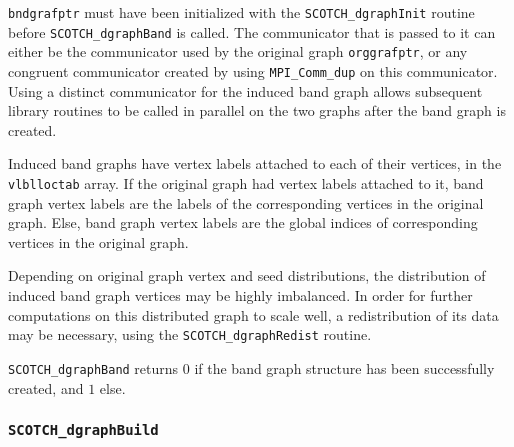 \begin{itemize}
{\tt bndgrafptr} must have been initialized with the
{\tt SCOTCH\_\lbt dgraph\lbt Init} routine before
{\tt SCOTCH\_dgraph\lbt Band} is called. The communicator that is
passed to it can either be the communicator used by the original graph
{\tt org\lbt graf\lbt ptr}, or any congruent communicator created by
using {\tt MPI\_\lbt Comm\_\lbt dup} on this communicator. Using a
distinct communicator for the induced band graph allows subsequent
library routines to be called in parallel on the two graphs after the
band graph is created.

Induced band graphs have vertex labels attached to each of their
vertices, in the {\tt vlbl\lbt loc\lbt tab} array. If the original
graph had vertex labels attached to it, band graph vertex labels are
the labels of the corresponding vertices in the original graph. Else,
band graph vertex labels are the global indices of corresponding
vertices in the original graph.

Depending on original graph vertex and seed distributions, the
distribution of induced band graph vertices may be highly
imbalanced. In order for further computations on this distributed
graph to scale well, a redistribution of its data may be necessary,
using the {\tt SCOTCH\_dgraph\lbt Redist} routine.

\progret

{\tt SCOTCH\_dgraphBand} returns $0$ if the band graph structure has
been successfully created, and $1$ else.
\end{itemize}

\subsubsection{{\tt SCOTCH\_dgraphBuild}}

